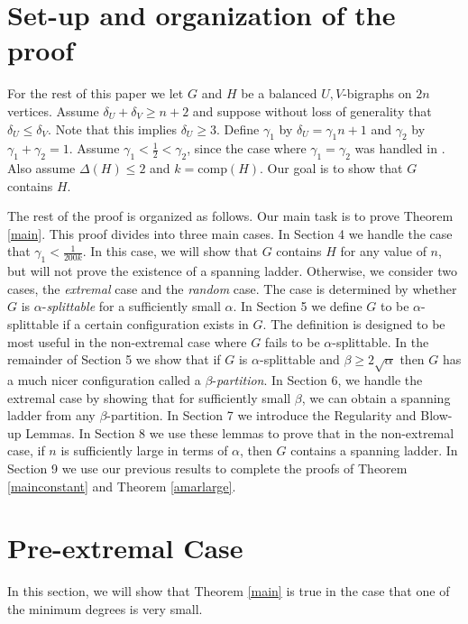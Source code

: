 \documentclass[oneside,12pt]{memoir}
\newcommand{\g}{\gamma}
\begin{document}
\section{Set-up and organization of the proof}

For the rest of this paper we let $G$ and $H$ be a balanced $U,V$-bigraphs on $2n$ vertices. Assume $\delta_{U}+\delta_{V}\geq n+2$ and suppose without loss of generality that $\delta_U\leq \delta_V$. Note that this implies $\delta_U\ge 3$. %
Define $\g_1$ by $\delta_U=\g_1 n+1$ and $\g_2$ by $\g_1+\g_2=1$.  Assume  $\g_1<\frac{1}{2}< \g_2$, since the case where $\g_1=\g_2$ was handled in \cite{CK}. Also assume $\Delta(H)\le2 $ and $k=\mathrm{comp}(H)$. Our goal is to show that $G$ contains $H$.   

The rest of the proof is organized as follows. Our main task is to
prove Theorem \ref{main}. This proof divides into three main cases.
In Section 4 we handle the case that $\gamma_{1}<\frac{1}{200k}$.
In this case, we will show that $G$ contains $H$ for any value of
$n$, but will not prove the existence of a spanning ladder. Otherwise,
we consider two cases, the \emph{extremal} case and the \emph{random}
case. The case is determined by whether $G$ is $\alpha$-\emph{splittable}
for a sufficiently small $\alpha$. In Section 5 we define
$G$ to be $\alpha$-splittable if a certain configuration exists
in $G$. The definition is designed to be most useful in the non-extremal
case where $G$ fails to be $\alpha$-splittable. In the remainder
of Section 5 we show that if $G$ is $\alpha$-splittable and $\beta\ge 2\sqrt{\alpha}$ then $G$ has
a much nicer configuration called a $\beta$-\emph{partition}. In Section 6,  we handle the extremal case by showing that for sufficiently small $\beta$, we can obtain a spanning ladder from any $\beta$-partition. In Section 7 we introduce the Regularity
and Blow-up Lemmas. In Section 8 we use these lemmas to prove that in
the non-extremal case, if $n$ is sufficiently large in terms of $\alpha$, then $G$ contains
a spanning ladder. In Section 9 we use our previous results to complete
the proofs of Theorem \ref{mainconstant} and Theorem \ref{amarlarge}.


\section{Pre-extremal Case}

In this section, we will show that Theorem \ref{main} is true in
the case that one of the minimum degrees is very small.
\end{document}

